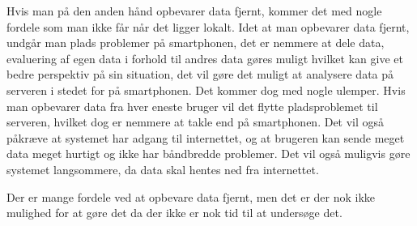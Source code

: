 Hvis man på den anden hånd opbevarer data fjernt, kommer det med nogle fordele som man ikke får når det ligger lokalt. Idet at man opbevarer data fjernt, undgår man plads problemer på smartphonen, det er nemmere at dele data, evaluering af egen data i forhold til andres data gøres muligt hvilket kan give et bedre perspektiv på sin situation, det vil gøre det muligt at analysere data på serveren i stedet for på smartphonen. 
Det kommer dog med nogle ulemper. Hvis man opbevarer data fra hver eneste bruger vil det flytte pladsproblemet til serveren, hvilket dog er nemmere at takle end på smartphonen. Det vil også påkræve at systemet har adgang til internettet, og at brugeren kan sende meget data meget hurtigt og ikke har båndbredde problemer. Det vil også muligvis gøre systemet langsommere, da data skal hentes ned fra internettet.

Der er mange fordele ved at opbevare data fjernt, men det er der nok ikke mulighed for at gøre det da der ikke er nok tid til at undersøge det.



